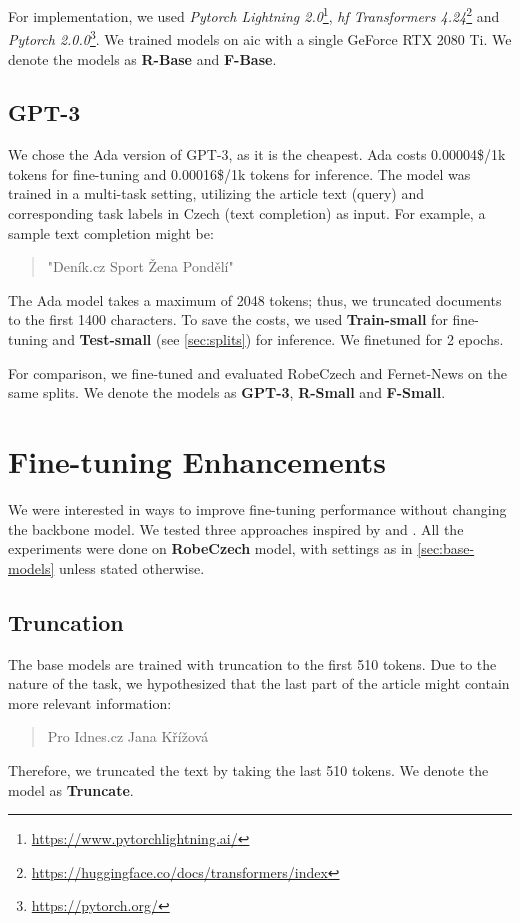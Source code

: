For implementation, we used \textit{Pytorch Lightning 2.0}\footnote{\url{https://www.pytorchlightning.ai/}},
\textit{\ac{hf} Transformers 4.24}\footnote{\url{https://huggingface.co/docs/transformers/index}}
and \textit{Pytorch 2.0.0}\footnote{\url{https://pytorch.org/}}.
We trained models on \ac{aic} with a single GeForce RTX 2080 Ti.
We denote the models as \textbf{R-Base} and \textbf{F-Base}.

\subsection{GPT-3}
\label{sec:gpt-3}
We chose the Ada version of GPT-3, as it is the cheapest.
Ada costs 0.00004\$/1k tokens for fine-tuning and 0.00016\$/1k tokens for inference.
The model was trained in a multi-task setting, utilizing the article text
(query) and corresponding task labels in Czech (text completion) as input. For
example, a sample text completion might be:
\begin{quote}
    "Deník.cz Sport Žena Pondělí"
\end{quote}

The Ada model takes a maximum of 2048 tokens; thus, we truncated documents to the first 1400 characters.
To save the costs, we used \textbf{Train-small} for fine-tuning and
\textbf{Test-small} (see \autoref{sec:splits}) for inference.
We finetuned for 2 epochs.

For comparison, we fine-tuned and evaluated RobeCzech and Fernet-News on the same splits.
We denote the models as \textbf{GPT-3}, \textbf{R-Small} and \textbf{F-Small}.

\section{Fine-tuning Enhancements}
\label{sec:finetuning}
We were interested in ways to improve fine-tuning performance without changing the backbone model.
We tested three approaches inspired by \textcite{howardUniversalLanguageModel2018a} and \textcite{sunHowFineTuneBERT2020}.
All the experiments were done on \textbf{RobeCzech} model, with settings as in \autoref{sec:base-models}
unless stated otherwise.

\subsection{Truncation}
\label{sec:truncation}
The base models are trained with truncation to the first 510 tokens.
Due to the nature of the task,
we hypothesized that the last part of the article might contain more relevant information:
\begin{quote}
    Pro Idnes.cz Jana Křížová
\end{quote}
Therefore, we truncated the text by taking the last 510 tokens.
We denote the model as \textbf{Truncate}.

